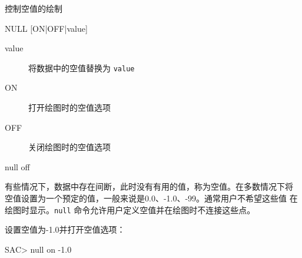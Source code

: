 \label{cmd:null}

控制空值的绘制

\begin{SACSTX}
NULL [ON|OFF|value]
\end{SACSTX}

\begin{description}
\item [value] 将数据中的空值替换为 \texttt{value}
\item [ON] 打开绘图时的空值选项
\item [OFF] 关闭绘图时的空值选项
\end{description}

\begin{SACDFT}
null off
\end{SACDFT}

有些情况下，数据中存在间断，此时没有有用的值，称为空值。在多数情况下将
空值设置为一个预定的值，一般来说是0.0、-1.0、-99。通常用户不希望这些值
在绘图时显示。\texttt{null} 命令允许用户定义空值并在绘图时不连接这些点。

设置空值为-1.0并打开空值选项：
\begin{SACCode}
SAC> null on -1.0
\end{SACCode}
